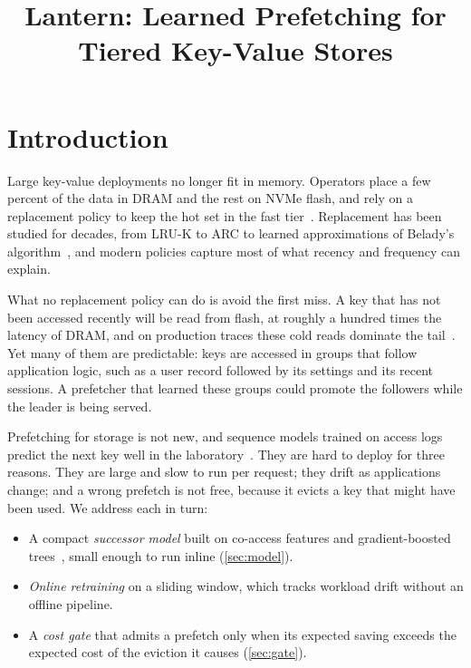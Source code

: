 \documentclass[10pt, twocolumn]{article}
\title{Lantern: Learned Prefetching for Tiered Key-Value Stores}
\begin{document}
\maketitle


\section{Introduction}

Large key-value deployments no longer fit in memory. Operators place a few
percent of the data in DRAM and the rest on NVMe flash, and rely on a
replacement policy to keep the hot set in the fast tier~\cite{varga2022tiered,
yang2020twitter}. Replacement has been studied for decades, from LRU-K to
ARC to learned approximations of Belady's
algorithm~\cite{oneil1993lruk,megiddo2003arc,song2020lrb}, and modern
policies capture most of what recency and frequency can explain.

What no replacement policy can do is avoid the first miss. A key that has
not been accessed recently will be read from flash, at roughly a hundred
times the latency of DRAM, and on production traces these cold reads
dominate the tail~\cite{yang2020twitter}. Yet many of them are predictable:
keys are accessed in groups that follow application logic, such as a user
record followed by its settings and its recent sessions. A prefetcher that
learned these groups could promote the followers while the leader is being
served.

Prefetching for storage is not new, and sequence models trained on access
logs predict the next key well in the
laboratory~\cite{hashemi2018,osei2023prefetch}. They are hard to deploy for
three reasons. They are large and slow to run per request; they drift as
applications change; and a wrong prefetch is not free, because it evicts a
key that might have been used. We address each in turn:

\begin{itemize}
  \item A compact \emph{successor model} built on co-access features and
    gradient-boosted trees~\cite{ke2019lightgbm}, small enough to run inline
    (\cref{sec:model}).
  \item \emph{Online retraining} on a sliding window, which tracks workload
    drift without an offline pipeline.
  \item A \emph{cost gate} that admits a prefetch only when its expected
    saving exceeds the expected cost of the eviction it causes
    (\cref{sec:gate}).
\end{itemize}
\end{document}
